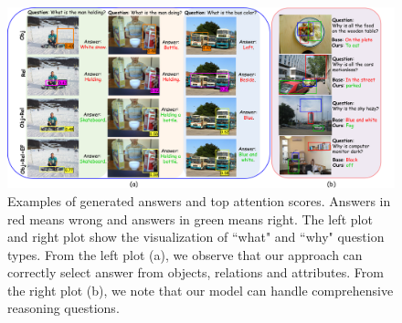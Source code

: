 \documentclass[letterpaper]{article} %
\begin{document}

\begin{figure}[ht] 
    \vspace{-0.5in}
    \centering 
    \includegraphics[width=1\textwidth]{./pic/visual_aaai2.pdf} 
    \caption{Examples of generated answers and top attention scores. Answers in red means wrong and answers in green means right. The left plot and right plot show the visualization of ``what" and ``why" question types. From the left plot (a), we observe that our approach can correctly select answer from objects, relations and attributes. From the right plot (b), we note that our model can handle comprehensive reasoning questions.} 
    \label{visual} 
    \vspace{-0.1in}
\end{figure}
\end{document}
